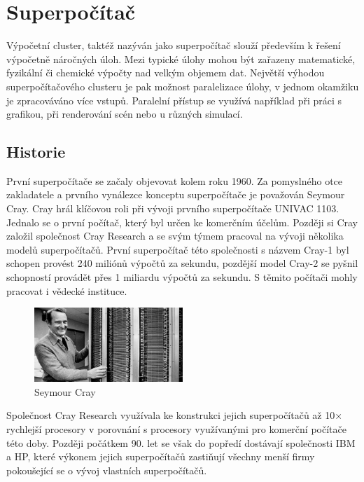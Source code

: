 \chapter{Superpočítač}
Výpočetní cluster, taktéž nazýván jako superpočítač slouží především k řešení výpočetně náročných úloh. Mezi typické úlohy mohou být zařazeny matematické, fyzikální či chemické výpočty nad velkým objemem dat. Největší výhodou superpočítačového clusteru je pak možnost paralelizace úlohy, v jednom okamžiku je zpracováváno více vstupů. Paralelní přístup se využívá například při práci s grafikou, při renderování scén nebo u různých simulací.

\section{Historie}
První superpočítače se začaly objevovat kolem roku 1960. Za pomyslného otce zakladatele a prvního vynálezce konceptu superpočítače je považován Seymour Cray. Cray hrál klíčovou roli při vývoji prvního superpočítače UNIVAC 1103. Jednalo se o první počítač, který byl určen ke komerčním účelům. Později si Cray založil společnost Cray Research a se svým týmem pracoval na vývoji několika modelů superpočítačů. První superpočítač této společnosti s názvem Cray-1 byl schopen provést 240 miliónů výpočtů za sekundu, pozdější model Cray-2 se pyšnil schopností provádět přes 1 miliardu výpočtů za sekundu. S těmito počítači mohly pracovat i vědecké instituce.\cite{E1JpczXW0qh9e98N}

\begin{figure}
	\centering
	\includegraphics[width=0.5\textwidth]{Figures/seymour-cray.jpg}
	\caption{Seymour Cray \cite{Tronner20150626}}
	\label{fig:seymour-cray}
\end{figure}

Společnost Cray Research využívala ke konstrukci jejich superpočítačů až 10× rychlejší procesory v porovnání s procesory využívanými pro komerční počítače této doby. Později počátkem 90. let se však do popředí dostávají společnosti IBM a HP, které výkonem jejich superpočítačů zastiňují všechny menší firmy pokoušející se o vývoj vlastních superpočítačů.

